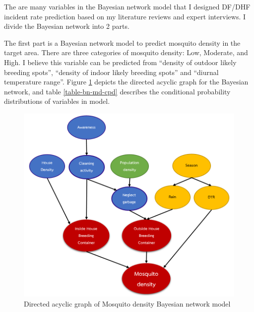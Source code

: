 \documentclass[review]{elsarticle}
\begin{document}
The are many variables in the Bayesian network model that I designed DF/DHF incident rate prediction based on my literature reviews and expert interviews. I divide the Bayesian network into 2 parts.

The first part is a Bayesian network model to predict mosquito density in the target area. There are three categories of mosquito density: Low, Moderate, and High. I believe this variable can be predicted from “density of outdoor likely breeding spots”, “density of indoor likely breeding spots” and “diurnal temperature range”. Figure \ref{figure-bn_mosquito_density} depicts the directed acyclic graph for the Bayesian network, and table \ref{table-bn-md-cpd} describes the conditional probability distributions of variables in model.

\begin{figure}[htbp]
	\begin{center}
		\includegraphics[width=150mm]{./figures/bn_mosquito_density}
		\caption{Directed acyclic graph of Mosquito density Bayesian network model}
		\label{figure-bn_mosquito_density}
	\end{center}
\end{figure}

\end{document}
